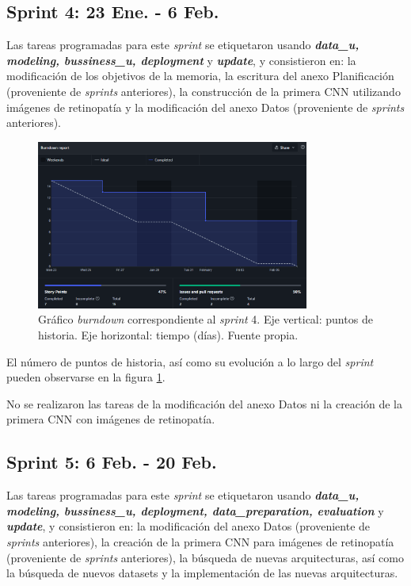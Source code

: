 \subsection{Sprint 4: 23 Ene. - 6 Feb.}

Las tareas programadas para este \textit{sprint} se etiquetaron usando \textbf{\textit{data\_u, modeling, bussiness\_u, deployment}} y \textbf{\textit{update}}, y consistieron en: la modificación de los objetivos de la memoria, la escritura del anexo Planificación (proveniente de \textit{sprints} anteriores), la construcción de la primera CNN utilizando imágenes de retinopatía y la modificación del anexo Datos (proveniente de \textit{sprints} anteriores). 

\begin{figure}[h]
    \centering
    \includegraphics[width=0.8\textwidth]{img/bd_23ene.png}
    \caption{Gráfico \textit{burndown} correspondiente al \textit{sprint} 4. Eje vertical: puntos de historia. Eje horizontal: tiempo (días). Fuente propia.}
    \label{fig:bd_4}
\end{figure}

El número de puntos de historia, así como su evolución a lo largo del \textit{sprint} pueden observarse en la figura \ref{fig:bd_4}.

No se realizaron las tareas de la modificación del anexo Datos ni la creación de la primera CNN con imágenes de retinopatía.

\subsection{Sprint 5: 6 Feb. - 20 Feb.}

Las tareas programadas para este \textit{sprint} se etiquetaron usando \textbf{\textit{data\_u, modeling, bussiness\_u, deployment, data\_preparation, evaluation}} y \textbf{\textit{update}}, y consistieron en: la modificación del anexo Datos (proveniente de \textit{sprints} anteriores), la creación de la primera CNN para imágenes de retinopatía (proveniente de \textit{sprints} anteriores), la búsqueda de nuevas arquitecturas, así como la búsqueda de nuevos datasets y la implementación de las nuevas arquitecturas. 

